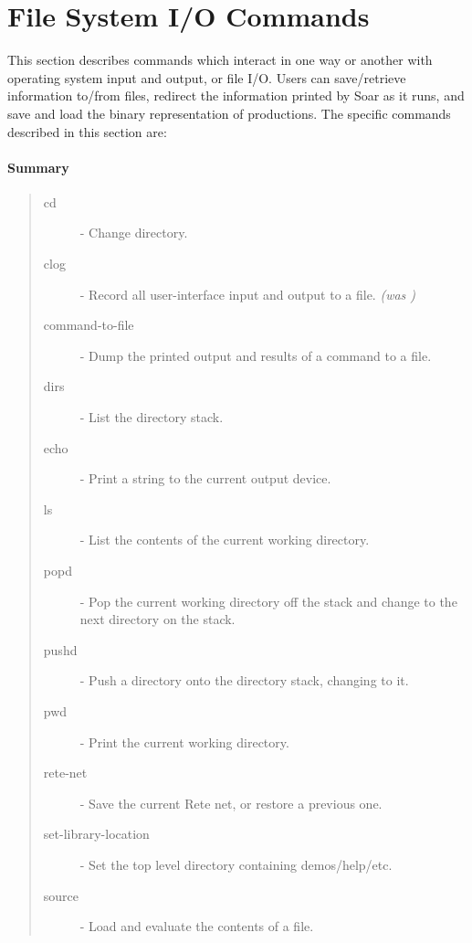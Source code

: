 
\section{File System I/O Commands}
\label{FILE-IO}

This section describes commands which interact in one way or another
with operating system input and output, or file I/O.  Users can
save/retrieve information to/from files, redirect the information
printed by Soar as it runs, and save and load the binary representation
of productions.
The specific commands described in this section are:

\paragraph{Summary}
\begin{quote}
\begin{description}
\item[cd] - Change directory.
\item[clog] - Record all user-interface input and output to a file. \emph{(was )}
\item[command-to-file] - Dump the printed output and results of a command to a file. 
\item[dirs] - List the directory stack.
\item[echo] -  Print a string to the current output device.
\item[ls] - List the contents of the current working directory.
\item[popd] - Pop the current working directory off the stack and change to the next directory on the stack.
\item[pushd] - Push a directory onto the directory stack, changing to it.
\item[pwd] - Print the current working directory.
\item[rete-net] - Save the current Rete net, or restore a previous one.
\item[set-library-location] - Set the top level directory containing demos/help/etc.
\item[source] - Load and evaluate the contents of a file.
\end{description}
\end{quote}

